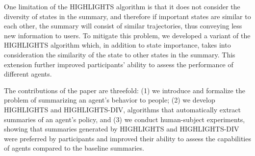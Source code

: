 One limitation of the HIGHLIGHTS algorithm is that it does not consider the diversity of states in the summary, and therefore if important states are similar to each other, the summary will consist of similar trajectories, thus conveying less new information to users. To mitigate this problem, we developed a variant of the HIGHLIGHTS algorithm which, in addition to state importance, takes into consideration the similarity of the state to other states in the summary. This extension further improved participants' ability to assess the performance of different agents.

The contributions of the paper are threefold: (1) we introduce and formalize the problem of summarizing an agent's behavior to people; (2) we develop HIGHLIGHTS and HIGHLIGHTS-DIV, algorithms that automatically extract summaries of an agent's policy, and (3) we conduct human-subject experiments, showing that summaries generated by HIGHLIGHTS and HIGHLIGHTS-DIV were preferred by participants and improved their ability to assess the capabilities of agents compared to the baseline summaries.

